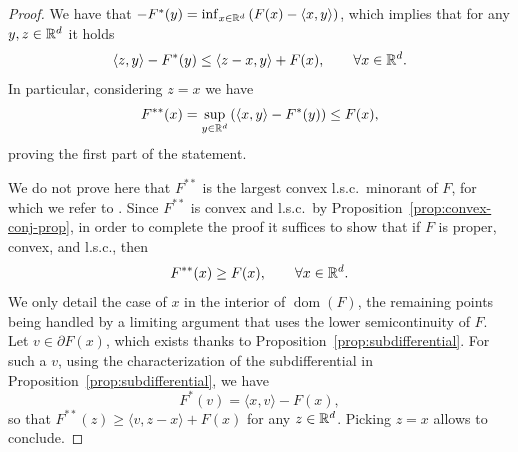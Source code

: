  \begin{proof}
     We have that $-F^*(y)=\inf_{x\in\mathbb{R}^d} \left(F(x)-\langle x,y\rangle\right)$, which implies that for any $y,z\in\mathbb{R}^d$ it holds
     \begin{equation}
         \langle z,y\rangle - F^*(y) \le \langle z-x,y\rangle +F(x), \qquad \forall x\in\mathbb{R}^d.
     \end{equation}
     In particular, considering $z=x$ we have
     \begin{equation}
         F^{**}(x) = \sup_{y\in\mathbb{R}^d} \left(\langle x,y\rangle - F^*(y)\right) \le F(x),
     \end{equation}
     proving the first part of the statement.
 
     We do not prove here that $F^{**}$ is the largest convex l.s.c.~minorant of $F$, for which we refer to \cite{rockafellarConvex2015}.
     Since $F^{**}$ is convex and l.s.c.~by Proposition~\ref{prop:convex-conj-prop}, in order to complete the proof it suffices to show that if $F$ is proper, convex, and l.s.c., then
     \begin{equation}
         F^{**}(x)\ge F(x),\qquad \forall x\in\mathbb{R}^d.
     \end{equation}
     We only detail the case of $x$ in the interior of $\operatorname{dom}(F)$, the remaining points being handled by a limiting argument that uses the lower semicontinuity of $F$.
     Let $v\in \partial F(x)$, which exists thanks to Proposition~\ref{prop:subdifferential}. For such a $v$, using the characterization of the subdifferential in Proposition~\ref{prop:subdifferential}, we have
     \begin{equation}
         F^*(v)=\langle x,v\rangle - F(x),
     \end{equation}
     so that $F^{**}(z)\ge \langle v,z-x\rangle+F(x)$ for any $z\in \mathbb{R}^d$. Picking $z=x$ allows to conclude.
 \end{proof}
 
 
 
 
